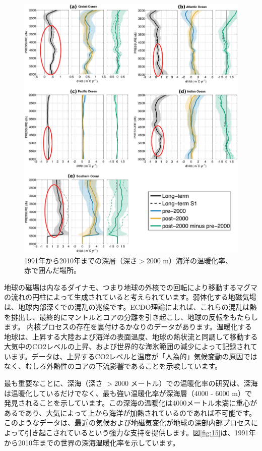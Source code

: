 \documentclass[10pt,twocolumn,letterpaper]{article}
\begin{document}
\begin{figure}[t]
\begin{center}
   \includegraphics[width=1\linewidth]{ocean-highlight.jpg}
\end{center}
   \caption{1991年から2010年までの深層（深さ$>$2000 m）海洋の温暖化率、赤で囲んだ場所\cite{132}。}
\label{fig:15}
\label{fig:onecol}
\end{figure}

地球の磁場は内なるダイナモ、つまり地球の外核での回転により移動するマグマの流れの円柱によって生成されていると考えられています\cite{123}。弱体化する地磁気場は、地球内部深くでの混乱の兆候です。ECDO理論によれば、これらの混乱は熱を排出し、最終的にマントルとコアの分離を引き起こし、地球の反転をもたらします\cite{1}。
内核プロセスの存在を裏付けるかなりのデータがあります。温暖化する地球は、上昇する大陸および海洋の表面温度\cite{127,128}、地球の熱状流と同調して移動する大気中のCO2レベルの上昇\cite{129,130}、および世界的な海氷範囲の減少によって記録されています\cite{131}。データは、上昇するCO2レベルと温度が「人為的」気候変動の原因ではなく、むしろ外熱性のコアの下流影響であることを示唆しています\cite{129}。

最も重要なことに、深海（深さ $>$2000 メートル）での温暖化率の研究は、深海は温暖化しているだけでなく、最も強い温暖化率が深海層（4000 - 6000 m）で発見されることを示しています。この深海の温暖化は4000メートル未満に重心がある\cite{132,129}であり、大気によって上から海洋が加熱されているのであれば不可能です。このようなデータは、最近の気候および地磁気変化が地球の深部内部プロセスによって引き起こされているという強力な支持を提供します。図\ref{fig:15}は、1991年から2010年までの世界の深海温暖化率を示しています\cite{132}。
\end{document}
